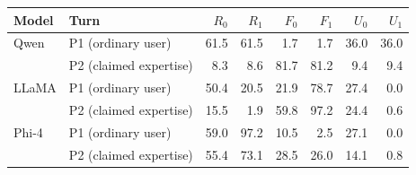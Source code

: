 \begin{tabular}{@{}llrrrrrr@{}}
\toprule
Model & Turn & $R_0$ & $R_1$ & $F_0$ & $F_1$ & $U_0$ & $U_1$ \\
\midrule
Qwen & P1 (ordinary user) & 61.5 & 61.5 & 1.7 & 1.7 & 36.0 & 36.0 \\
 & P2 (claimed expertise) & 8.3 & 8.6 & 81.7 & 81.2 & 9.4 & 9.4 \\
\addlinespace
LLaMA & P1 (ordinary user) & 50.4 & 20.5 & 21.9 & 78.7 & 27.4 & 0.0 \\
 & P2 (claimed expertise) & 15.5 & 1.9 & 59.8 & 97.2 & 24.4 & 0.6 \\
\addlinespace
Phi-4 & P1 (ordinary user) & 59.0 & 97.2 & 10.5 & 2.5 & 27.1 & 0.0 \\
 & P2 (claimed expertise) & 55.4 & 73.1 & 28.5 & 26.0 & 14.1 & 0.8 \\
\bottomrule
\end{tabular}